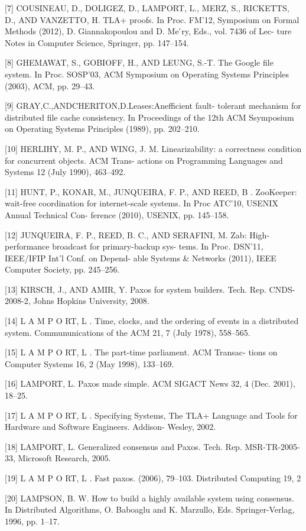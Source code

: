 \documentclass[journal]{IEEEtran}
\begin{document}
[7] COUSINEAU, D., DOLIGEZ, D., LAMPORT, L., MERZ, S., RICKETTS, D., AND VANZETTO, H. TLA+ proofs. In Proc. FM’12, Symposium on Formal Methods (2012), D. Giannakopoulou and D. Me ́ry, Eds., vol. 7436 of Lec- ture Notes in Computer Science, Springer, pp. 147–154.

[8] GHEMAWAT, S., GOBIOFF, H., AND LEUNG, S.-T. The Google file system. In Proc. SOSP’03, ACM Symposium on Operating Systems Principles (2003), ACM, pp. 29–43.

[9] GRAY,C.,ANDCHERITON,D.Leases:Anefficient fault- tolerant mechanism for distributed file cache consistency. In Proceedings of the 12th ACM Ssymposium on Operating Systems Principles (1989), pp. 202–210.

[10] HERLIHY, M. P., AND WING, J. M. Linearizability: a correctness condition for concurrent objects. ACM Trans- actions on Programming Languages and Systems 12 (July 1990), 463–492.

[11] HUNT, P., KONAR, M., JUNQUEIRA, F. P., AND REED, B . ZooKeeper: wait-free coordination for internet-scale systems. In Proc ATC’10, USENIX Annual Technical Con- ference (2010), USENIX, pp. 145–158.

[12] JUNQUEIRA, F. P., REED, B. C., AND SERAFINI, M. Zab: High-performance broadcast for primary-backup sys- tems. In Proc. DSN’11, IEEE/IFIP Int’l Conf. on Depend- able Systems \& Networks (2011), IEEE Computer Society, pp. 245–256.

[13] KIRSCH, J., AND AMIR, Y. Paxos for system builders. Tech. Rep. CNDS-2008-2, Johns Hopkins University, 2008.

[14] L A M P O RT, L . Time, clocks, and the ordering of events in a distributed system. Commununications of the ACM 21, 7 (July 1978), 558–565.

[15] L A M P O RT, L . The part-time parliament. ACM Transac- tions on Computer Systems 16, 2 (May 1998), 133–169.

[16] LAMPORT, L. Paxos made simple. ACM SIGACT News 32, 4 (Dec. 2001), 18–25.

[17] L A M P O RT, L . Specifying Systems, The TLA+ Language and Tools for Hardware and Software Engineers. Addison- Wesley, 2002.

[18] LAMPORT, L. Generalized consensus and Paxos. Tech. Rep. MSR-TR-2005-33, Microsoft Research, 2005.

[19] L A M P O RT, L . Fast paxos. (2006), 79–103.
Distributed Computing 19, 2

[20] LAMPSON, B. W. How to build a highly available system using consensus. In Distributed Algorithms, O. Baboaglu and K. Marzullo, Eds. Springer-Verlag, 1996, pp. 1–17.
\end{document}
